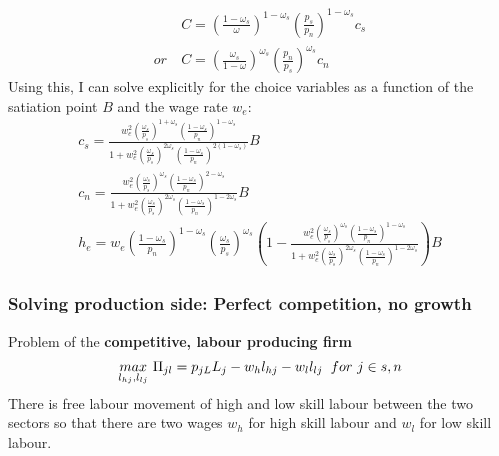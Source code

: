\begin{align*}
&C= \left(\frac{1-\omega_s}{\omega}\right)^{1-\omega_s}\left(\frac{p_s}{p_n}\right)^{1-\omega_s}c_s\\
or\ & C= \left(\frac{\omega_s}{1-\omega}\right)^{\omega_s}\left(\frac{p_n}{p_s}\right)^{\omega_s}c_n
\end{align*} 
Using this, I can solve explicitly for the choice variables as a function of the satiation point $B$ and the wage rate $w_e$:
\begin{align}
c_s=\frac{w_e^2\left(\frac{\omega_s}{p_s}\right)^{1+\omega_s}\left(\frac{1-\omega_s}{p_n}\right)^{1-\omega_s}}{1+w_e^2\left(\frac{\omega_s}{p_s}\right)^{2\omega_s}\left(\frac{1-\omega_s}{p_n}\right)^{2(1-\omega_s)}}B\\
c_n=\frac{w_e^2\left(\frac{\omega_s}{p_s}\right)^{\omega_s}\left(\frac{1-\omega_s}{p_n}\right)^{2-\omega_s}}{1+w_e^2\left(\frac{\omega_s}{p_s}\right)^{2\omega_s}\left(\frac{1-\omega_s}{p_n}\right)^{1-2\omega_s}}B\\
h_e=w_e \left(\frac{1-\omega_s}{p_n}\right)^{1-\omega_s}\left(\frac{\omega_s}{p_s}\right)^{\omega_s}\left(1-
\frac{w_e^2\left(\frac{\omega_s}{p_s}\right)^{\omega_s}\left(\frac{1-\omega_s}{p_n}\right)^{1-\omega_s}}{1+w_e^2\left(\frac{\omega_s}{p_s}\right)^{2\omega_s}\left(\frac{1-\omega_s}{p_n}\right)^{1-2\omega_s}}\right)B
\end{align}

\subsubsection{Solving production side: Perfect competition, no growth}
Problem of the \textbf{competitive, labour producing firm}
\begin{align*}
\underset{l_{hj}, l_{lj}}{max}\  \Pi_{jl}=p_{jL}L_j-w_hl_{hj}-w_ll_{lj} \hspace{2mm} for \ j\in{s,n}
\end{align*}
There is free labour movement of high and low skill labour between the two sectors so that there are two wages $w_h$ for high skill labour and $w_l$ for low skill labour. 

